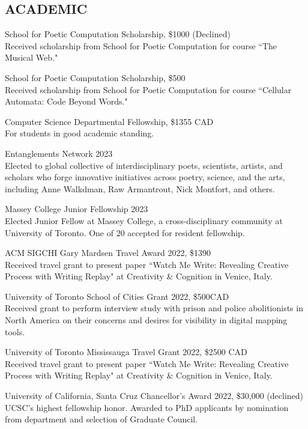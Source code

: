  \subsection{ACADEMIC}
 
 School for Poetic Computation Scholarship, \$1000 (Declined) \\
Received scholarship from School for Poetic Computation for course ``The Musical Web."
 
School for Poetic Computation Scholarship, \$500  \\
Received scholarship from School for Poetic Computation for course ``Cellular Automata: Code Beyond Words."
 
Computer Science Departmental Fellowship, \$1355 CAD \\
For students in good academic standing. 
 
Entanglements Network 2023 \\
 Elected to global collective of interdisciplinary poets, scientists, artists, and scholars who forge innovative initiatives across poetry, science, and the arts, including Anne Walkdman, Raw Armantrout, Nick Montfort, and others. 

 Massey College Junior Fellowship 2023 \\
 Elected Junior Fellow at Massey College, a cross-disciplinary community at University of Toronto. One of 20 accepted for resident fellowship.  
 
 ACM SIGCHI Gary Mardsen Travel Award 2022, \$1390  \\
Received travel grant to present paper ``Watch Me Write: Revealing Creative Process with Writing Replay" at Creativity \& Cognition in Venice, Italy.
 
University of Toronto School of Cities Grant 2022, \$500CAD \\
Received grant to perform interview study with prison and police abolitionists in North America on their concerns and desires for visibility in digital mapping tools.

University of Toronto Mississauga Travel Grant 2022, \$2500 CAD \\
Received travel grant to present paper ``Watch Me Write: Revealing Creative Process with Writing Replay" at Creativity \& Cognition in Venice, Italy.

University of California, Santa Cruz Chancellor's Award 2022, \$30,000 (declined) \\
UCSC's highest fellowship honor. Awarded to PhD applicants by nomination from department and selection of Graduate Council.

